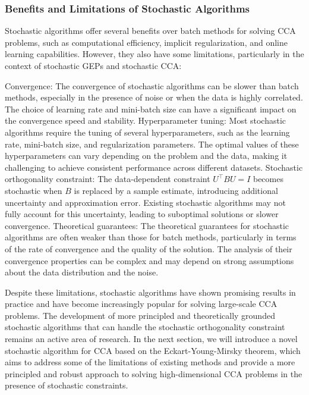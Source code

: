 \subsubsection{Benefits and Limitations of Stochastic Algorithms}
Stochastic algorithms offer several benefits over batch methods for solving CCA problems, such as computational efficiency, implicit regularization, and online learning capabilities. However, they also have some limitations, particularly in the context of stochastic GEPs and stochastic CCA:

Convergence: The convergence of stochastic algorithms can be slower than batch methods, especially in the presence of noise or when the data is highly correlated. The choice of learning rate and mini-batch size can have a significant impact on the convergence speed and stability.
Hyperparameter tuning: Most stochastic algorithms require the tuning of several hyperparameters, such as the learning rate, mini-batch size, and regularization parameters. The optimal values of these hyperparameters can vary depending on the problem and the data, making it challenging to achieve consistent performance across different datasets.
Stochastic orthogonality constraint: The data-dependent constraint $U^\top B U = I$ becomes stochastic when $B$ is replaced by a sample estimate, introducing additional uncertainty and approximation error. Existing stochastic algorithms may not fully account for this uncertainty, leading to suboptimal solutions or slower convergence.
Theoretical guarantees: The theoretical guarantees for stochastic algorithms are often weaker than those for batch methods, particularly in terms of the rate of convergence and the quality of the solution. The analysis of their convergence properties can be complex and may depend on strong assumptions about the data distribution and the noise.

Despite these limitations, stochastic algorithms have shown promising results in practice and have become increasingly popular for solving large-scale CCA problems. The development of more principled and theoretically grounded stochastic algorithms that can handle the stochastic orthogonality constraint remains an active area of research.
In the next section, we will introduce a novel stochastic algorithm for CCA based on the Eckart-Young-Mirsky theorem, which aims to address some of the limitations of existing methods and provide a more principled and robust approach to solving high-dimensional CCA problems in the presence of stochastic constraints.

